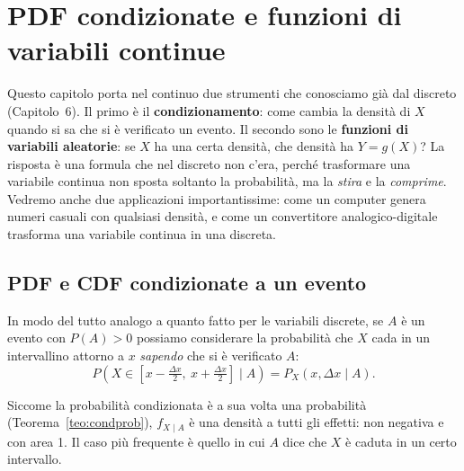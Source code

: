 \chapter{PDF condizionate e funzioni di variabili continue}

Questo capitolo porta nel continuo due strumenti che conosciamo già dal discreto (Capitolo~6). Il primo è il
\textbf{condizionamento}: come cambia la densità di $X$ quando si sa che si è verificato un evento. Il secondo sono le
\textbf{funzioni di variabili aleatorie}: se $X$ ha una certa densità, che densità ha $Y = g(X)$? La risposta è una
formula che nel discreto non c'era, perché trasformare una variabile continua non sposta soltanto la probabilità, ma la
\emph{stira} e la \emph{comprime}. Vedremo anche due applicazioni importantissime: come un computer genera numeri
casuali con qualsiasi densità, e come un convertitore analogico-digitale trasforma una variabile continua in una
discreta.

\section{PDF e CDF condizionate a un evento}

In modo del tutto analogo a quanto fatto per le variabili discrete, se $A$ è un evento con $P(A) > 0$ possiamo
considerare la probabilità che $X$ cada in un intervallino attorno a $x$ \emph{sapendo} che si è verificato $A$:
\[ P\left( X \in \left[ x - \tfrac{\Delta x}{2},\ x + \tfrac{\Delta x}{2} \right] \;\Big|\; A \right) = P_X(x, \Delta x
   \mid A) . \]


Siccome la probabilità condizionata è a sua volta una probabilità (Teorema~\ref{teo:condprob}), $f_{X \mid A}$ è una
densità a tutti gli effetti: non negativa e con area 1. Il caso più frequente è quello in cui $A$ dice che $X$ è caduta
in un certo intervallo.

